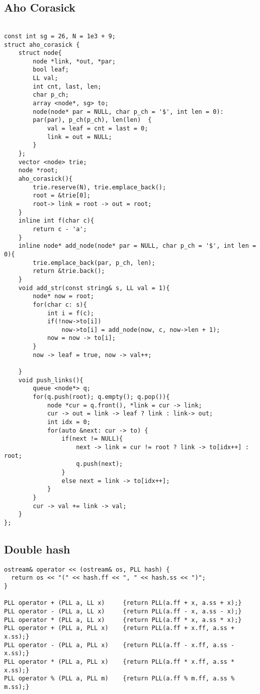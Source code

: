 \documentclass[FSZ,a4paper,onesided]{article}
\begin{document}
\begin{multicols*}{\COLS}
\subsection{Aho Corasick}
\begin{lstlisting}

const int sg = 26, N = 1e3 + 9;
struct aho_corasick {
    struct node{
        node *link, *out, *par;
        bool leaf;
        LL val;
        int cnt, last, len;
        char p_ch;
        array <node*, sg> to;
        node(node* par = NULL, char p_ch = '$', int len = 0): 
        par(par), p_ch(p_ch), len(len)  {
            val = leaf = cnt = last = 0;
            link = out = NULL;
        }
    };
    vector <node> trie;
    node *root;
    aho_corasick(){
        trie.reserve(N), trie.emplace_back();
        root = &trie[0];
        root-> link = root -> out = root;
    }
    inline int f(char c){
        return c - 'a';
    }
    inline node* add_node(node* par = NULL, char p_ch = '$', int len = 0){
        trie.emplace_back(par, p_ch, len);
        return &trie.back();
    }
    void add_str(const string& s, LL val = 1){
        node* now = root;
        for(char c: s){
            int i = f(c);
            if(!now->to[i])
                now->to[i] = add_node(now, c, now->len + 1);
            now = now -> to[i];
        }
        now -> leaf = true, now -> val++;

    }
    void push_links(){
        queue <node*> q;
        for(q.push(root); q.empty(); q.pop()){
            node *cur = q.front(), *link = cur -> link;
            cur -> out = link -> leaf ? link : link-> out;
            int idx = 0;
            for(auto &next: cur -> to) {
                if(next != NULL){
                    next -> link = cur != root ? link -> to[idx++] : root;
                    q.push(next);
                } 
                else next = link -> to[idx++]; 
            }
        }
        cur -> val += link -> val;
    }
};
\end{lstlisting}
\subsection{Double hash}
\begin{lstlisting}
ostream& operator << (ostream& os, PLL hash) {
  return os << "(" << hash.ff << ", " << hash.ss << ")";
}

PLL operator + (PLL a, LL x)     {return PLL(a.ff + x, a.ss + x);}
PLL operator - (PLL a, LL x)     {return PLL(a.ff - x, a.ss - x);}
PLL operator * (PLL a, LL x)     {return PLL(a.ff * x, a.ss * x);}
PLL operator + (PLL a, PLL x)    {return PLL(a.ff + x.ff, a.ss + x.ss);}
PLL operator - (PLL a, PLL x)    {return PLL(a.ff - x.ff, a.ss - x.ss);}
PLL operator * (PLL a, PLL x)    {return PLL(a.ff * x.ff, a.ss * x.ss);}
PLL operator % (PLL a, PLL m)    {return PLL(a.ff % m.ff, a.ss % m.ss);}


\end{lstlisting}
\end{multicols*}
\end{document}
